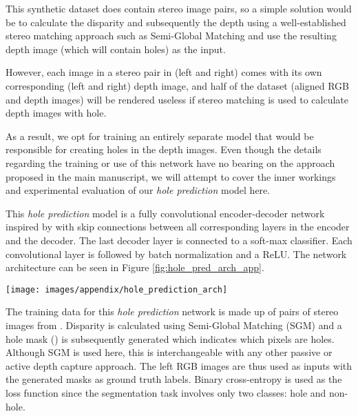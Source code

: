 \documentclass[10pt,twocolumn,letterpaper]{article}
\begin{document}
{This synthetic dataset \cite{RosCVPR16} does contain stereo image pairs, so a simple solution would be to calculate the disparity and subsequently the depth using a well-established stereo matching approach such as Semi-Global Matching \cite{hirschmuller2008stereo} and use the resulting depth image (which will contain holes) as the input.

However, each image in a stereo pair in \cite{RosCVPR16} (left and right) comes with its own corresponding (left and right) depth image, and half of the dataset (aligned RGB and depth images) will be rendered useless if stereo matching is used to calculate depth images with hole.

As a result, we opt for training an entirely separate model that would be responsible for creating holes in the depth images. Even though the details regarding the training or use of this network have no bearing on the approach proposed in the main manuscript, we will attempt to cover the inner workings and experimental evaluation of our \textit{hole prediction} model here.

This \textit{hole prediction} model is a fully convolutional encoder-decoder network inspired by \cite{ronneberger2015u} with skip connections between all corresponding layers in the encoder and the decoder. The last decoder layer is connected to a soft-max classifier. Each convolutional layer is followed by batch normalization \cite{ioffe2015batch} and a ReLU. The network architecture can be seen in Figure \ref{fig:hole_pred_arch_app}.

\begin{figure*}[b!]
	\centering
	\texttt{[image: images/appendix/hole\_prediction\_arch]}
	\captionsetup[figure]{skip=7pt}
	\label{fig:hole_pred_arch_app}\vspace{-0.4cm}
\end{figure*}


The training data for this \textit{hole prediction} network is made up of  pairs of stereo images from \cite{Geiger2013IJRR}. Disparity is calculated using Semi-Global Matching (SGM) \cite{hirschmuller2008stereo} and a hole mask () is subsequently generated which indicates which pixels are holes. Although SGM is used here, this is interchangeable with any other passive or active depth capture approach. The left RGB images are thus used as inputs with the generated masks as ground truth labels. Binary cross-entropy is used as the loss function since the segmentation task involves only two classes: hole and non-hole.

}
\end{document}
